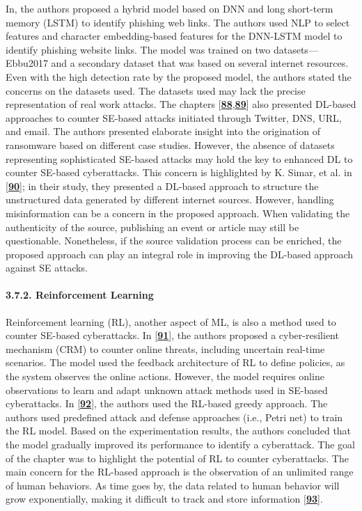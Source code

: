 {In, the authors proposed a hybrid model based on DNN and long short-term memory (LSTM) to identify phishing web links. The authors used NLP to select features and character embedding-based features for the DNN-LSTM model to identify phishing website links. The model was trained on two datasets—Ebbu2017 and a secondary dataset that was based on several internet resources. Even with the high detection rate by the proposed model, the authors stated the concerns on the datasets used. The datasets used may lack the precise representation of real work attacks. The chapters [\href{https://www.mdpi.com/2076-3417/12/12/6042\#B88-applsci-12-06042}{\textbf{88}},\href{https://www.mdpi.com/2076-3417/12/12/6042\#B89-applsci-12-06042}{\textbf{89}}] also presented DL-based approaches to counter SE-based attacks initiated through Twitter, DNS, URL, and email. The authors presented elaborate insight into the origination of ransomware based on different case studies. However, the absence of datasets representing sophisticated SE-based attacks may hold the key to enhanced DL to counter SE-based cyberattacks. This concern is highlighted by K. Simar, et al. in [\href{https://www.mdpi.com/2076-3417/12/12/6042\#B90-applsci-12-06042}{\textbf{90}}]; in their study, they presented a DL-based approach to structure the unstructured data generated by different internet sources. However, handling misinformation can be a concern in the proposed approach. When validating the authenticity of the source, publishing an event or article may still be questionable. Nonetheless, if the source validation process can be enriched, the proposed approach can play an integral role in improving the DL-based approach against SE attacks.

\paragraph{3.7.2. Reinforcement Learning}

Reinforcement learning (RL), another aspect of ML, is also a method used to counter SE-based cyberattacks. In [\href{https://www.mdpi.com/2076-3417/12/12/6042\#B91-applsci-12-06042}{\textbf{91}}], the authors proposed a cyber-resilient mechanism (CRM) to counter online threats, including uncertain real-time scenarios. The model used the feedback architecture of RL to define policies, as the system observes the online actions. However, the model requires online observations to learn and adapt unknown attack methods used in SE-based cyberattacks. In [\href{https://www.mdpi.com/2076-3417/12/12/6042\#B92-applsci-12-06042}{\textbf{92}}], the authors used the RL-based greedy approach. The authors used predefined attack and defense approaches (i.e., Petri net) to train the RL model. Based on the experimentation results, the authors concluded that the model gradually improved its performance to identify a cyberattack. The goal of the chapter was to highlight the potential of RL to counter cyberattacks. The main concern for the RL-based approach is the observation of an unlimited range of human behaviors. As time goes by, the data related to human behavior will grow exponentially, making it difficult to track and store information [\href{https://www.mdpi.com/2076-3417/12/12/6042\#B93-applsci-12-06042}{\textbf{93}}].

}
